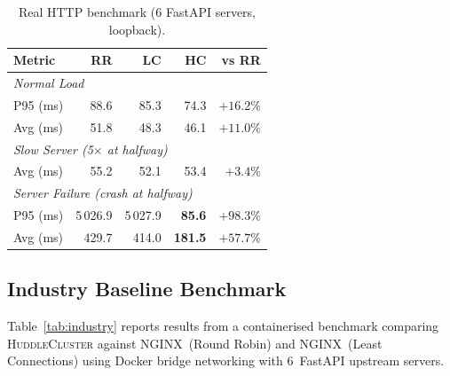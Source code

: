 \documentclass[10pt,twocolumn]{article}
\begin{document}
\begin{table}[h]
\centering
\caption{Real HTTP benchmark (6 FastAPI servers, loopback).}
\label{tab:http}
\small
\setlength{\tabcolsep}{4pt}
\begin{tabular}{lrrrr}
\toprule
Metric & RR & LC & HC & vs RR \\
\midrule
\multicolumn{5}{l}{\textit{Normal Load}} \\
P95 (ms)   & 88.6  & 85.3  & 74.3  & $+16.2\%$ \\
Avg (ms)   & 51.8  & 48.3  & 46.1  & $+11.0\%$ \\
\midrule
\multicolumn{5}{l}{\textit{Slow Server (5$\times$ at halfway)}} \\
Avg (ms)   & 55.2  & 52.1  & 53.4  & $+3.4\%$ \\
\midrule
\multicolumn{5}{l}{\textit{Server Failure (crash at halfway)}} \\
P95 (ms)   & 5\,026.9 & 5\,027.9 & \textbf{85.6} & $+98.3\%$ \\
Avg (ms)   &   429.7  &   414.0  & \textbf{181.5} & $+57.7\%$ \\
\bottomrule
\end{tabular}
\end{table}

\subsection{Industry Baseline Benchmark}

Table~\ref{tab:industry} reports results from a containerised benchmark
comparing \textsc{HuddleCluster} against NGINX~(Round Robin) and
NGINX~(Least Connections) using Docker bridge networking with 6~FastAPI
upstream servers.
\end{document}
